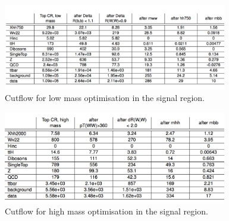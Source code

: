 \begin{figure}[!h]
\begin{center}
\includegraphics*[width=0.87\textwidth] {chapters/dihiggs/tables/opt700_unblinded_cutflow.pdf}
\caption[Cutflow for low mass optimisation in the signal region.]{Cutflow for low mass optimisation in the signal region.}
\end{center}
\label{fig:lowcutflow2}
\end{figure}


\begin{figure}[!h]
\begin{center}
\includegraphics*[width=0.87\textwidth] {chapters/dihiggs/tables/opt2000_unblinded_cutflow.pdf}
\caption[Cutflow for high mass optimisation in the signal region. ]{Cutflow for high mass optimisation in the signal region.}
\end{center}
\label{fig:eleven}
\end{figure}

\clearpage
